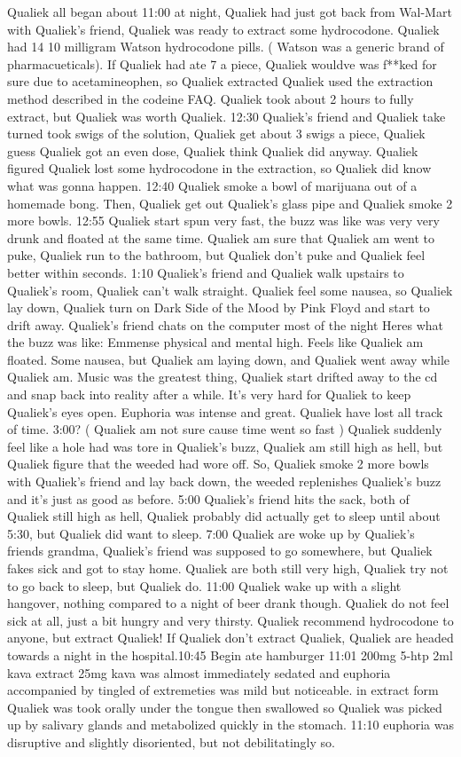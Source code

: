 \documentclass[12pt]{book}
\begin{document}
Qualiek all began about 11:00 at night, Qualiek had just got back from Wal-Mart with Qualiek's friend, Qualiek was ready to extract some hydrocodone. Qualiek had 14 10 milligram Watson hydrocodone pills. ( Watson was a generic brand of pharmacueticals). If Qualiek had ate 7 a piece, Qualiek wouldve was f**ked for sure due to acetamineophen, so Qualiek extracted Qualiek used the extraction method described in the codeine FAQ. Qualiek took about 2 hours to fully extract, but Qualiek was worth Qualiek. 12:30 Qualiek's friend and Qualiek take turned took swigs of the solution, Qualiek get about 3 swigs a piece, Qualiek guess Qualiek got an even dose, Qualiek think Qualiek did anyway. Qualiek figured Qualiek lost some hydrocodone in the extraction, so Qualiek did know what was gonna happen. 12:40 Qualiek smoke a bowl of marijuana out of a homemade bong. Then, Qualiek get out Qualiek's glass pipe and Qualiek smoke 2 more bowls. 12:55 Qualiek start spun very fast, the buzz was like was very very drunk and floated at the same time. Qualiek am sure that Qualiek am went to puke, Qualiek run to the bathroom, but Qualiek don't puke and Qualiek feel better within seconds. 1:10 Qualiek's friend and Qualiek walk upstairs to Qualiek's room, Qualiek can't walk straight. Qualiek feel some nausea, so Qualiek lay down, Qualiek turn on Dark Side of the Mood by Pink Floyd and start to drift away. Qualiek's friend chats on the computer most of the night Heres what the buzz was like: Emmense physical and mental high. Feels like Qualiek am floated. Some nausea, but Qualiek am laying down, and Qualiek went away while Qualiek am. Music was the greatest thing, Qualiek start drifted away to the cd and snap back into reality after a while. It's very hard for Qualiek to keep Qualiek's eyes open. Euphoria was intense and great. Qualiek have lost all track of time. 3:00? ( Qualiek am not sure cause time went so fast ) Qualiek suddenly feel like a hole had was tore in Qualiek's buzz, Qualiek am still high as hell, but Qualiek figure that the weeded had wore off. So, Qualiek smoke 2 more bowls with Qualiek's friend and lay back down, the weeded replenishes Qualiek's buzz and it's just as good as before. 5:00 Qualiek's friend hits the sack, both of Qualiek still high as hell, Qualiek probably did actually get to sleep until about 5:30, but Qualiek did want to sleep. 7:00 Qualiek are woke up by Qualiek's friends grandma, Qualiek's friend was supposed to go somewhere, but Qualiek fakes sick and got to stay home. Qualiek are both still very high, Qualiek try not to go back to sleep, but Qualiek do. 11:00 Qualiek wake up with a slight hangover, nothing compared to a night of beer drank though. Qualiek do not feel sick at all, just a bit hungry and very thirsty. Qualiek recommend hydrocodone to anyone, but extract Qualiek! If Qualiek don't extract Qualiek, Qualiek are headed towards a night in the hospital.10:45 Begin ate hamburger 11:01 200mg 5-htp 2ml kava extract 25mg kava was almost immediately sedated and euphoria accompanied by tingled of extremeties was mild but noticeable. in extract form Qualiek was took orally under the tongue then swallowed so Qualiek was picked up by salivary glands and metabolized quickly in the stomach. 11:10 euphoria was disruptive and slightly disoriented, but not debilitatingly so. 
\end{document}
